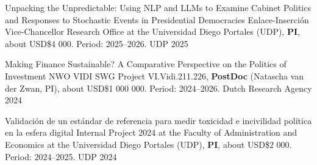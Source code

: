 





\vspace{1mm}

\begin{cvhonors}
\cvhonor
{Unpacking the Unpredictable: Using NLP and LLMs to Examine Cabinet Politics and Responses to Stochastic Events in Presidential Democracies}
{Enlace-Inserción Vice-Chancellor Research Office at the Universidad Diego Portales (UDP), {\bfseries PI}, about USD\$4 000. Period: 2025--2026.} 
{UDP}
{2025}
\end{cvhonors}

\vspace{1mm}

\begin{cvhonors}
\cvhonor
{Making Finance Sustainable? A Comparative Perspective on the Politics of Investment}
{NWO VIDI SWG Project VI.Vidi.211.226, {\bfseries PostDoc} (Natascha van der Zwan, PI), about USD\$1 000 000. Period: 2024--2026.} %
{Dutch Research Agency}
{2024}
\end{cvhonors}

\vspace{1mm}

\begin{cvhonors}
\cvhonor
{Validación de un estándar de referencia para medir toxicidad e incivilidad política en la esfera digital}
{Internal Project 2024 at the Faculty of Administration and Economics at the Universidad Diego Portales (UDP), {\bfseries PI}, about USD\$2 000. Period: 2024--2025.} %
{UDP}
{2024}
\end{cvhonors}

\vspace{1mm}

